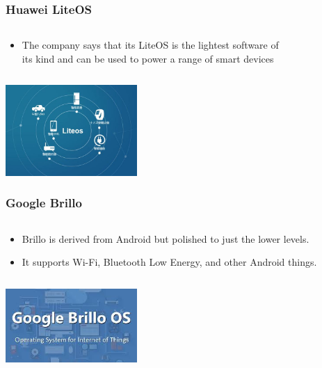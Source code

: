 \documentclass{beamer}
\begin{document}
\begin{frame}
	\frametitle{Huawei LiteOS}
	\begin{columns}[c]
		\begin{column}{30cm}
			\vspace{.1cm}
			\begin{itemize}
				\justifying
				\item The company says that its \textcolor{TextOrange}{LiteOS} is
				the \textcolor{TextGreen}{lightest} software of\\
				its kind and can be used to power a range of smart devices
			\end{itemize}
		\end{column}
	\end{columns}
	\vspace{.5cm}
	\hspace*{5.5cm} \includegraphics[width=5cm]{figs/huawei-liteos-logo.jpg}
\end{frame}

\begin{frame}
	\frametitle{Google Brillo}
	\begin{columns}[c]
		\begin{column}{30cm}
			\vspace{.1cm}
			\begin{itemize}
				\justifying
				\item Brillo is \textcolor{TextGreen}{derived} from Android
				but \textcolor{TextGreen}{polished} to just the lower levels.
				\item It supports Wi-Fi, Bluetooth Low Energy, and other Android things.
			\end{itemize}
		\end{column}
	\end{columns}
	\vspace{.5cm}
	\hspace*{5.5cm} \includegraphics[width=5cm]{figs/google-brillo-logo.jpeg}
\end{frame}
\end{document}
